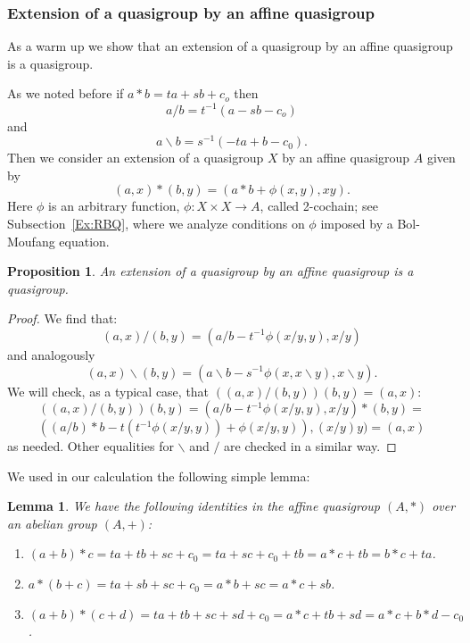 \documentclass[11pt]{amsart}
\newtheorem{lemma}[theorem]{Lemma}
\newtheorem{proposition}[theorem]{Proposition}
\theoremstyle{definition}
\begin{document}
\subsubsection{Extension of a quasigroup by an affine quasigroup}
As a warm up
we show that an extension of a quasigroup by an affine quasigroup is a quasigroup.

As we noted before if $a*b=ta+sb+c_o$ then
$$a/b= t^{-1}(a-sb-c_o)$$ and 
$$a\backslash b =s^{-1}(-ta+b-c_0).$$
Then we consider an extension of a quasigroup $X$ by an affine quasigroup $A$ given by 
$$(a,x)*(b,y)= (a*b+ \phi(x,y), xy).$$ 
Here $\phi$ is an arbitrary function, $\phi: X\times X \to A$, called 2-cochain; see Subsection~\ref{Ex:RBQ}, where we analyze conditions on $\phi$ imposed by a Bol-Moufang equation.
\begin{proposition}
An extension of a quasigroup by an affine quasigroup is a quasigroup.
\end{proposition}
\begin{proof}
We find that:
$$(a,x)/(b,y)= (a/b -t^{-1}\phi(x/y,y),x/y)$$
and analogously
$$(a,x)\backslash (b,y)=(a\backslash b - s^{-1}\phi(x,x\backslash y),x\backslash y).$$
We will check, as a typical case, that 
$((a,x)/(b,y))(b,y)= (a,x):$
$$((a,x)/(b,y))(b,y)=(a/b-t^{-1}\phi(x/y,y),x/y)*(b,y)= $$
$$((a/b)*b - t(t^{-1}\phi(x/y,y))+ \phi(x/y,y)),(x/y)y)=(a,x)$$
as needed. Other equalities for $\backslash $  and $/ $  are checked in a similar way.
\end{proof}

We used in our calculation the following simple lemma:
\begin{lemma}\label{lem:32}
We have the following identities in the affine quasigroup $(A,\ast)$ over an abelian group $(A,+)$:
\begin{enumerate}
\item[(1)] $(a+b)*c= ta+tb+sc+c_0= ta+sc+c_0 + tb= a*c+tb= b*c+ ta$.
\item[(2)] $ a*(b+c)= ta+sb +sc+ c_0= a*b+sc= a*c+sb$.
\item[(3)] $ (a+b)*(c+d)= ta+tb +sc+ sd+ c_0= a*c+tb+sd=a*c+b*d-c_0$.
\end{enumerate}
\end{lemma}
\end{document}
